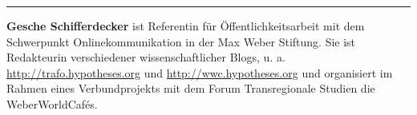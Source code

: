 \begin{center}\rule{0.5\linewidth}{\linethickness}\end{center}

\textbf{Gesche Schifferdecker} ist Referentin für Öffentlichkeitsarbeit
mit dem Schwerpunkt Onlinekommunikation in der Max Weber Stiftung. Sie
ist Redakteurin verschiedener wissenschaftlicher Blogs, u. a.
\url{http://trafo.hypotheses.org} und \url{http://wwc.hypotheses.org}
und organisiert im Rahmen eines Verbundprojekts mit dem Forum
Transregionale Studien die WeberWorldCafés.
